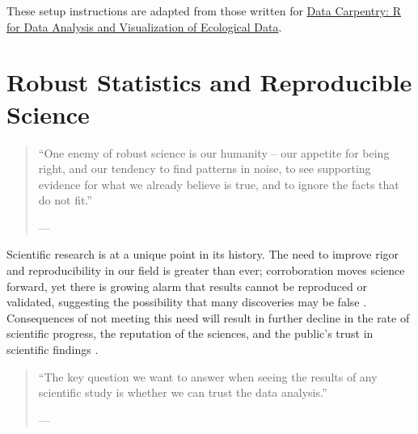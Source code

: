 \documentclass[
  12pt, krantz2,
]{krantz}
\theoremstyle{definition}
\theoremstyle{definition}
\theoremstyle{definition}
\newcommand{\1}{\mathbbm{1}}
\begin{document}
These setup instructions are adapted from those written for \href{http://www.datacarpentry.org/R-ecology-lesson/}{Data Carpentry: R
for Data Analysis and Visualization of Ecological
Data}.

\hypertarget{robust}{%
\chapter{Robust Statistics and Reproducible Science}\label{robust}}

\begin{quote}
``One enemy of robust science is our humanity -- our appetite for
being right, and our tendency to find patterns in noise, to see supporting
evidence for what we already believe is true, and to ignore the facts that do
not fit.''

--- \citet{naturenews_2015}
\end{quote}

Scientific research is at a unique point in its history. The need to improve
rigor and reproducibility in our field is greater than ever; corroboration moves
science forward, yet there is growing alarm that results cannot be reproduced or
validated, suggesting the possibility that many discoveries may be false
\citep{baker2016there}. Consequences of not meeting this need will result in further
decline in the rate of scientific progress, the reputation of the sciences, and
the public's trust in scientific findings \citep{munafo2017manifesto, naturenews2_2015}.

\begin{quote}
``The key question we want to answer when seeing the results of any scientific
study is whether we can trust the data analysis.''

--- \citet{peng2015reproducibility}
\end{quote}
\end{document}
